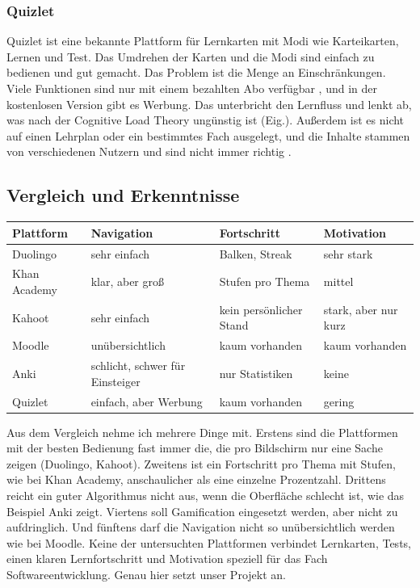  
\subsubsection{Quizlet}
 
Quizlet ist eine bekannte Plattform für Lernkarten mit Modi wie Karteikarten, Lernen und Test. Das Umdrehen der Karten und die Modi sind einfach zu bedienen und gut gemacht. Das Problem ist die Menge an Einschränkungen. Viele Funktionen sind nur mit einem bezahlten Abo verfügbar \parencite{quizletPlus}, und in der kostenlosen Version gibt es Werbung. Das unterbricht den Lernfluss und lenkt ab, was nach der Cognitive Load Theory ungünstig ist (Eig.). Außerdem ist es nicht auf einen Lehrplan oder ein bestimmtes Fach ausgelegt, und die Inhalte stammen von verschiedenen Nutzern und sind nicht immer richtig \parencite{quizletErrors,quizlet2026}.
 
 
\subsection{Vergleich und Erkenntnisse}
 
\begin{center}
\begin{tabular}{|p{2.6cm}|p{3.2cm}|p{3.4cm}|p{3.6cm}|}
\hline
\textbf{Plattform} & \textbf{Navigation} & \textbf{Fortschritt} & \textbf{Motivation} \\
\hline
Duolingo & sehr einfach & Balken, Streak & sehr stark \\
\hline
Khan Academy & klar, aber groß & Stufen pro Thema & mittel \\
\hline
Kahoot & sehr einfach & kein persönlicher Stand & stark, aber nur kurz \\
\hline
Moodle & unübersichtlich & kaum vorhanden & kaum vorhanden \\
\hline
Anki & schlicht, schwer für Einsteiger & nur Statistiken & keine \\
\hline
Quizlet & einfach, aber Werbung & kaum vorhanden & gering \\
\hline
\end{tabular}
\end{center}
 
Aus dem Vergleich nehme ich mehrere Dinge mit. Erstens sind die Plattformen mit der besten Bedienung fast immer die, die pro Bildschirm nur eine Sache zeigen (Duolingo, Kahoot). Zweitens ist ein Fortschritt pro Thema mit Stufen, wie bei Khan Academy, anschaulicher als eine einzelne Prozentzahl. Drittens reicht ein guter Algorithmus nicht aus, wenn die Oberfläche schlecht ist, wie das Beispiel Anki zeigt. Viertens soll Gamification eingesetzt werden, aber nicht zu aufdringlich. Und fünftens darf die Navigation nicht so unübersichtlich werden wie bei Moodle. Keine der untersuchten Plattformen verbindet Lernkarten, Tests, einen klaren Lernfortschritt und Motivation speziell für das Fach Softwareentwicklung. Genau hier setzt unser Projekt an.
 
